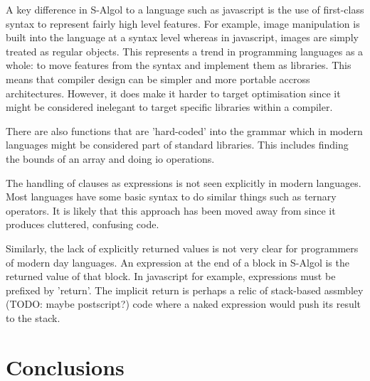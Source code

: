\documentclass{article}
\begin{document}
A key difference in S-Algol to a language such as javascript is the use of first-class syntax to represent fairly high level features. For example, image manipulation is built into the language at a syntax level whereas in javascript, images are simply treated as regular objects. This represents a trend in programming languages as a whole: to move features from the syntax and implement them as libraries. This means that compiler design can be simpler and more portable accross architectures. However, it does make it harder to target optimisation since it might be considered inelegant to target specific libraries within a compiler.

There are also functions that are 'hard-coded' into the grammar which in modern languages might be considered part of standard libraries. This includes finding the bounds of an array and doing io operations.

The handling of clauses as expressions is not seen explicitly in modern languages. Most languages have some basic syntax to do similar things such as ternary operators. It is likely that this approach has been moved away from since it produces cluttered, confusing code.

Similarly, the lack of explicitly returned values is not very clear for programmers of modern day languages. An expression at the end of a block in S-Algol is the returned value of that block. In javascript for example, expressions must be prefixed by 'return'. The implicit return is perhaps a relic of stack-based assmbley (TODO: maybe postscript?) code where a naked expression would push its result to the stack.

\section{Conclusions}



\printbibliography
\end{document}
